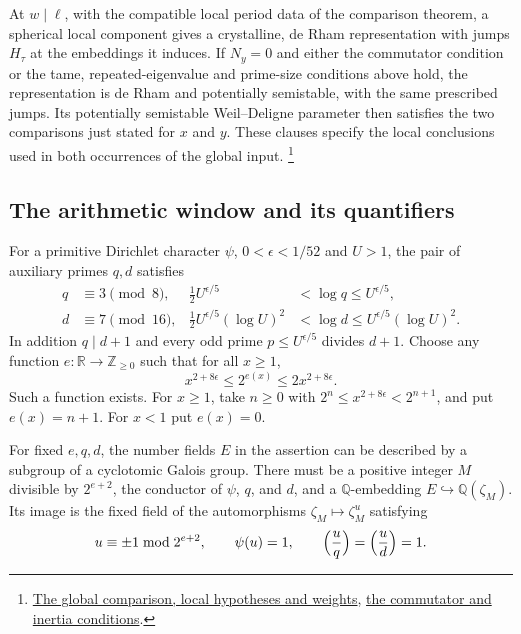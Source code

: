At \(w\mid\ell\), with the compatible local period data of the
comparison theorem, a spherical local component gives a crystalline,
de Rham representation with jumps \(H_\tau\) at the embeddings it
induces. If \(N_y=0\) and either the commutator condition or the tame,
repeated-eigenvalue and prime-size conditions above hold, the representation
is de Rham and potentially semistable, with the same prescribed jumps.
Its potentially semistable Weil--Deligne parameter then satisfies the
two comparisons just stated for \(x\) and \(y\). These clauses specify
the local conclusions used in both occurrences of the global input.
\footnote{\href{https://github.com/Deicyde/riemann-hypothesis/blob/40e56bab/src/Development/AutomorphicArithmetic/Foundations/GaloisRepresentations/TypeConditions/WeightsConjBis.lean\#L15-L86}{The global comparison, local hypotheses and weights},
\href{https://github.com/Deicyde/riemann-hypothesis/blob/40e56bab/src/Development/AutomorphicArithmetic/Foundations/GaloisRepresentations/TypeConditions/WeightsConjAlt.lean\#L22-L33}{the commutator and inertia conditions}.}

\subsection{The arithmetic window and its quantifiers}

For a primitive Dirichlet character \(\psi\), \(0<\epsilon<1/52\) and
\(U>1\), the pair of auxiliary primes \(q,d\) satisfies
\begin{align*}
 q&\equiv3\pmod8,& \tfrac12 U^{\epsilon/5}
                   &<\log q\le U^{\epsilon/5},\\
 d&\equiv7\pmod{16},&
 \tfrac12 U^{\epsilon/5}(\log U)^2
                   &<\log d\le U^{\epsilon/5}(\log U)^2 .
\end{align*}
In addition \(q\mid d+1\) and every odd prime \(p\le U^{\epsilon/5}\)
divides \(d+1\). Choose any function \(e:\mathbb R\to\mathbb Z_{\ge0}\)
such that for all \(x\ge1\),
\[
       x^{2+8\epsilon}\le 2^{e(x)}\le 2x^{2+8\epsilon}.
\]
Such a function exists. For \(x\ge1\), take \(n\ge0\) with
\(2^n\le x^{2+8\epsilon}<2^{n+1}\), and put \(e(x)=n+1\).
For \(x<1\) put \(e(x)=0\).

For fixed \(e,q,d\), the number fields \(E\) in the assertion can be
described by a subgroup of a cyclotomic Galois group. There must be
a positive integer \(M\) divisible by \(2^{e+2}\), the conductor of
\(\psi\), \(q\), and \(d\), and a \(\mathbb Q\)-embedding
\(E\hookrightarrow\mathbb Q(\zeta_M)\). Its image is the fixed field
of the automorphisms \(\zeta_M\mapsto\zeta_M^u\) satisfying
\[
  u\equiv\pm1\bmod 2^{e+2},\qquad \psi(u)=1,\qquad
  \Bigl(\frac uq\Bigr)=\Bigl(\frac ud\Bigr)=1.
\]

